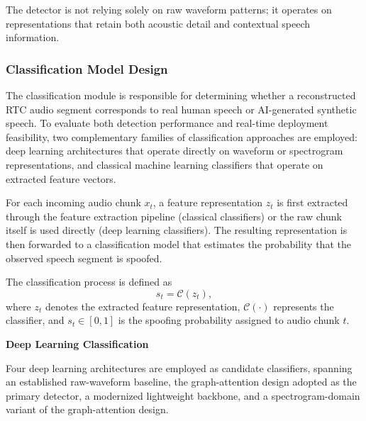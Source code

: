 The detector is not relying solely on raw waveform patterns; it operates on representations that retain both acoustic detail and contextual speech information.

\subsubsection{Classification Model Design}

The classification module is responsible for determining whether a reconstructed RTC audio segment corresponds to real human speech or AI-generated synthetic speech. To evaluate both detection performance and real-time deployment feasibility, two complementary families of classification approaches are employed: deep learning architectures that operate directly on waveform or spectrogram representations, and classical machine learning classifiers that operate on extracted feature vectors.

For each incoming audio chunk $x_t$, a feature representation $z_t$ is first extracted through the feature extraction pipeline (classical classifiers) or the raw chunk itself is used directly (deep learning classifiers). The resulting representation is then forwarded to a classification model that estimates the probability that the observed speech segment is spoofed.

The classification process is defined as
\begin{equation}
s_t = \mathcal{C}(z_t),
\end{equation}
where $z_t$ denotes the extracted feature representation, $\mathcal{C}(\cdot)$ represents the classifier, and $s_t \in [0,1]$ is the spoofing probability assigned to audio chunk $t$.

\textbf{Deep Learning Classification}

Four deep learning architectures are employed as candidate classifiers, spanning an established raw-waveform baseline, the graph-attention design adopted as the primary detector, a modernized lightweight backbone, and a spectrogram-domain variant of the graph-attention design.

